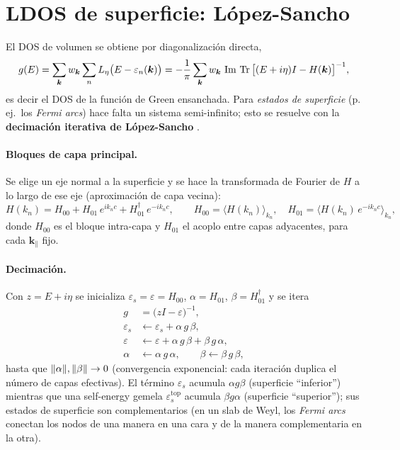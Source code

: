 \documentclass[11pt,a4paper]{article}
\newcommand{\kk}{\bm{k}}
\begin{document}
\section{LDOS de superficie: L\'opez-Sancho}
El DOS de volumen se obtiene por diagonalizaci\'on directa,
\begin{equation}
  g(E) = \sum_{\kk} w_{\kk}\sum_n L_\eta\big(E-\varepsilon_n(\kk)\big)
       = -\frac{1}{\pi}\sum_{\kk} w_{\kk}\,\Im\,\Tr\big[(E+i\eta)I - H(\kk)\big]^{-1},
\end{equation}
es decir el DOS de la funci\'on de Green ensanchada. Para \emph{estados de
superficie} (p.\,ej.\ los \emph{Fermi arcs}) hace falta un sistema
semi-infinito; esto se resuelve con la \textbf{decimaci\'on iterativa de
L\'opez-Sancho} \cite{Sancho1985}.

\paragraph{Bloques de capa principal.} Se elige un eje normal a la
superficie y se hace la transformada de Fourier de $H$ a lo largo de ese
eje (aproximaci\'on de capa vecina):
\begin{equation}
  H(k_n) = H_{00} + H_{01}\,e^{i k_n c} + H_{01}^{\dagger}\,e^{-i k_n c},
  \qquad
  H_{00} = \big\langle H(k_n)\big\rangle_{k_n},\quad
  H_{01} = \big\langle H(k_n)\,e^{-i k_n c}\big\rangle_{k_n},
\end{equation}
donde $H_{00}$ es el bloque intra-capa y $H_{01}$ el acoplo entre capas
adyacentes, para cada $\kk_\parallel$ fijo.

\paragraph{Decimaci\'on.} Con $z=E+i\eta$ se inicializa
$\varepsilon_s=\varepsilon=H_{00}$, $\alpha=H_{01}$, $\beta=H_{01}^{\dagger}$
y se itera
\begin{align}
  g &= \big(zI-\varepsilon\big)^{-1}, \\
  \varepsilon_s &\leftarrow \varepsilon_s + \alpha\,g\,\beta, \\
  \varepsilon   &\leftarrow \varepsilon + \alpha\,g\,\beta + \beta\,g\,\alpha, \\
  \alpha &\leftarrow \alpha\,g\,\alpha, \qquad
  \beta \leftarrow \beta\,g\,\beta,
\end{align}
hasta que $\norm{\alpha},\norm{\beta}\to0$ (convergencia exponencial:
cada iteraci\'on duplica el n\'umero de capas efectivas). El t\'ermino
$\varepsilon_s$ acumula $\alpha g\beta$ (superficie ``inferior'') mientras
que una self-energy gemela $\varepsilon_s^{\text{top}}$ acumula
$\beta g\alpha$ (superficie ``superior''); sus estados de superficie son
complementarios (en un slab de Weyl, los \emph{Fermi arcs} conectan los
nodos de una manera en una cara y de la manera complementaria en la otra).
\end{document}
